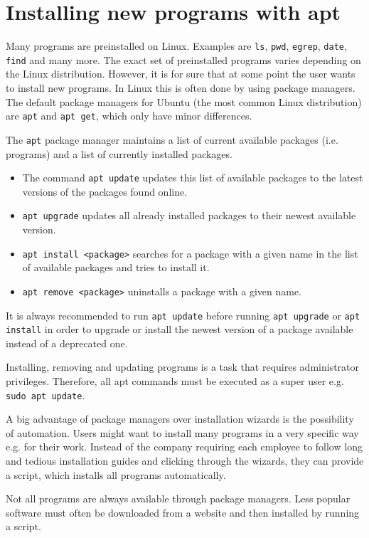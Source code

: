 \section{Installing new programs with apt}

Many programs are preinstalled on Linux. Examples are \lstinline{ls}, \lstinline{pwd}, \lstinline{egrep}, \lstinline{date}, \lstinline{find} and many more. The exact set of preinstalled programs varies depending on the Linux distribution. However, it is for sure that at some point the user wants to install new programs. In Linux this is often done by using package managers. The default package managers for Ubuntu (the most common Linux distribution) are \lstinline{apt} and \lstinline{apt get}, which only have minor differences.

The \lstinline{apt} package manager maintains a list of current available packages (i.e. programs) and a list of currently installed packages.

\begin{itemize}
    \item The command \lstinline{apt update} updates this list of available packages to the latest versions of the packages found online.
    \item \lstinline{apt upgrade} updates all already installed packages to their newest available version.
    \item \lstinline{apt install <package>} searches for a package with a given name in the list of available packages and tries to install it.
    \item \lstinline{apt remove <package>} uninstalls a package with a given name.
\end{itemize}

It is always recommended to run \lstinline{apt update} before running \lstinline{apt upgrade} or \lstinline{apt install} in order to upgrade or install the newest version of a package available instead of a deprecated one.

Installing, removing and updating programs is a task that requires administrator privileges. Therefore, all apt commands must be executed as a super user e.g. \lstinline{sudo apt update}. 

A big advantage of package managers over installation wizards is the possibility of automation. Users might want to install many programs in a very specific way e.g. for their work. Instead of the company requiring each employee to follow long and tedious installation guides and clicking through the wizards, they can provide a script, which installs all programs automatically.

Not all programs are always available through package managers. Less popular software must often be downloaded from a website and then installed by running a script. 


  